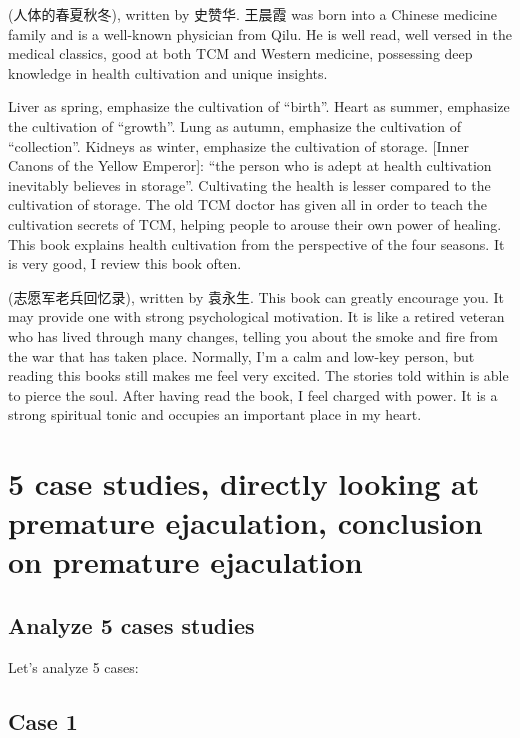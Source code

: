 \documentclass[
]{book}
\begin{document}
(人体的春夏秋冬), written by 史赞华. 王晨霞 was born into a Chinese medicine family and is a well-known physician from Qilu. He is well read, well versed in the medical classics, good at both TCM and Western medicine, possessing deep knowledge in health cultivation and unique insights.

Liver as spring, emphasize the cultivation of ``birth''. Heart as summer, emphasize the cultivation of ``growth''. Lung as autumn, emphasize the cultivation of ``collection''. Kidneys as winter, emphasize the cultivation of storage. {[}Inner Canons of the Yellow Emperor{]}: ``the person who is adept at health cultivation inevitably believes in storage''. Cultivating the health is lesser compared to the cultivation of storage. The old TCM doctor has given all in order to teach the cultivation secrets of TCM, helping people to arouse their own power of healing. This book explains health cultivation from the perspective of the four seasons. It is very good, I review this book often.

(志愿军老兵回忆录), written by 袁永生. This book can greatly encourage you. It may provide one with strong psychological motivation. It is like a retired veteran who has lived through many changes, telling you about the smoke and fire from the war that has taken place. Normally, I'm a calm and low-key person, but reading this books still makes me feel very excited. The stories told within is able to pierce the soul. After having read the book, I feel charged with power. It is a strong spiritual tonic and occupies an important place in my heart.

\hypertarget{case-studies-directly-looking-at-premature-ejaculation-conclusion-on-premature-ejaculation}{%
\chapter{5 case studies, directly looking at premature ejaculation, conclusion on premature ejaculation}\label{case-studies-directly-looking-at-premature-ejaculation-conclusion-on-premature-ejaculation}}

\hypertarget{analyze-5-cases-studies}{%
\section{Analyze 5 cases studies}\label{analyze-5-cases-studies}}

Let's analyze 5 cases:

\hypertarget{case-1}{%
\section{Case 1}\label{case-1}}
\end{document}
